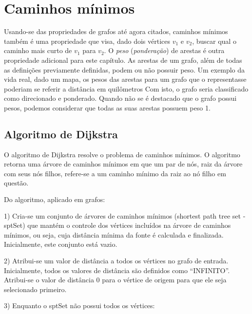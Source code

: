 \graphicspath{{\currfiledir/images/}}

\chapter{Caminhos mínimos}
Usando-se das propriedades de grafos até agora citados, caminhos mínimos também é uma propriedade que visa, dado dois vértices $v_1$ e $v_2$, buscar qual o caminho mais curto de $v_1$ para $v_2$. O \emph{peso} (\emph{ponderação}) de arestas é outra propriedade adicional para este capítulo. As arestas de um grafo, além de todas as definições previamente definidas, podem ou não possuir peso. Um exemplo da vida real, dado um mapa, os pesos das arestas para um grafo que o representasse poderiam se referir a distância em quilômetros Com isto, o grafo seria classificado como direcionado e ponderado. Quando não se é destacado que o grafo possui pesos, podemos considerar que todas as suas arestas possuem peso 1.

\section{Algoritmo de Dijkstra}
O algoritmo de Dijkstra resolve o problema de caminhos mínimos. O algoritmo retorna uma árvore de caminhos mínimos em que um par de nós, raiz da árvore com seus nós filhos, refere-se a um caminho mínimo da raiz ao nó filho em questão.

Do algoritmo, aplicado em grafos:

1) Cria-se um conjunto de árvores de caminhos mínimos (shortest path tree set - sptSet) que mantém o controle dos vértices incluídos na árvore de caminhos mínimos, ou seja, cuja distância mínima da fonte é calculada e finalizada. Inicialmente, este conjunto está vazio.

2) Atribui-se um valor de distância a todos os vértices no grafo de entrada. Inicialmente, todos os valores de distância são definidos como ``INFINITO''. Atribui-se o valor de distância 0 para o vértice de origem para que ele seja selecionado primeiro.

3) Enquanto o sptSet não possui todos os vértices:

